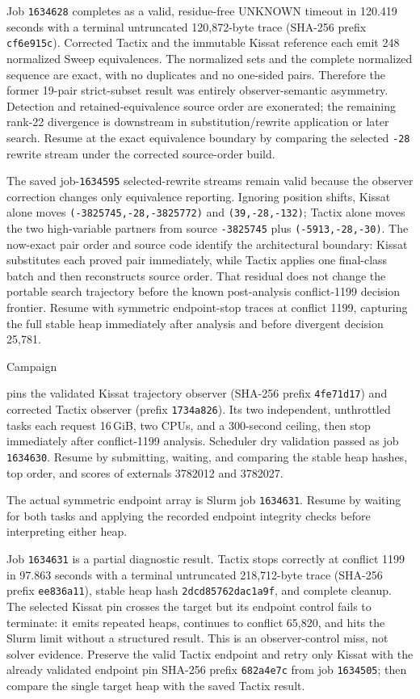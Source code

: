 \documentclass[11pt]{article}
\newcommand{\code}[1]{\texttt{#1}}
\newcommand{\artifact}[1]{\path{#1}}
\begin{document}
Job \code{1634628} completes as a valid, residue-free UNKNOWN timeout in
120.419 seconds with a terminal untruncated 120,872-byte trace (SHA-256 prefix
\code{cf6e915c}). Corrected Tactix and the immutable Kissat reference each emit
248 normalized Sweep equivalences. The normalized sets and the complete
normalized sequence are exact, with no duplicates and no one-sided pairs.
Therefore the former 19-pair strict-subset result was entirely observer-semantic
asymmetry. Detection and retained-equivalence source order are exonerated; the
remaining rank-22 divergence is downstream in substitution/rewrite application
or later search. Resume at the exact equivalence boundary by comparing the
selected \code{-28} rewrite stream under the corrected source-order build.

The saved job-\code{1634595} selected-rewrite streams remain valid because the
observer correction changes only equivalence reporting. Ignoring position
shifts, Kissat alone moves \code{(-3825745,-28,-3825772)} and
\code{(39,-28,-132)}; Tactix alone moves the two high-variable partners from
source \code{-3825745} plus \code{(-5913,-28,-30)}. The now-exact pair order
and source code identify the architectural boundary: Kissat substitutes each
proved pair immediately, while Tactix applies one final-class batch and then
reconstructs source order. That residual does not change the portable search
trajectory before the known post-analysis conflict-1199 decision frontier.
Resume with symmetric endpoint-stop traces at conflict 1199, capturing the full
stable heap immediately after analysis and before divergent decision 25,781.

Campaign
\begin{center}\small\artifact{20260819-1243-tierd-rank22-c1199-heap-endpoint}\end{center}
pins the validated Kissat trajectory observer (SHA-256 prefix \code{4fe71d17})
and corrected Tactix observer (prefix \code{1734a826}). Its two independent,
unthrottled tasks each request 16\,GiB, two CPUs, and a 300-second ceiling, then
stop immediately after conflict-1199 analysis. Scheduler dry validation passed
as job \code{1634630}. Resume by submitting, waiting, and comparing the stable
heap hashes, top order, and scores of externals 3782012 and 3782027.

The actual symmetric endpoint array is Slurm job \code{1634631}. Resume by
waiting for both tasks and applying the recorded endpoint integrity checks
before interpreting either heap.

Job \code{1634631} is a partial diagnostic result. Tactix stops correctly at
conflict 1199 in 97.863 seconds with a terminal untruncated 218,712-byte trace
(SHA-256 prefix \code{ee836a11}), stable heap hash
\code{2dcd85762dac1a9f}, and complete cleanup. The selected Kissat pin crosses
the target but its endpoint control fails to terminate: it emits repeated heaps,
continues to conflict 65,820, and hits the Slurm limit without a structured
result. This is an observer-control miss, not solver evidence. Preserve the
valid Tactix endpoint and retry only Kissat with the already validated endpoint
pin SHA-256 prefix \code{682a4e7c} from job \code{1634505}; then compare the
single target heap with the saved Tactix result.
\end{document}
